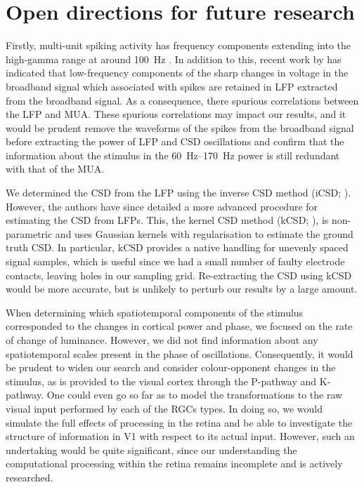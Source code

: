 \section{Open directions for future research}

Firstly, multi-unit spiking activity has frequency components extending into the high-gamma range at around \SI{100}{Hz} \citep{Einevoll2013}.
In addition to this, recent work by \citet{Zanos2011} has indicated that low-frequency components of the sharp changes in voltage in the broadband signal which associated with spikes are retained in \ac{LFP} extracted from the broadband signal.
As a consequence, there spurious correlations between the \ac{LFP} and \ac{MUA}.
These spurious correlations may impact our results, and it would be prudent remove the waveforms of the spikes from the broadband signal before extracting the power of \ac{LFP} and \ac{CSD} oscillations \citep{Zanos2011} and confirm that the information about the stimulus in the \SIrange{60}{170}{Hz} power is still redundant with that of the \ac{MUA}.

We determined the \ac{CSD} from the \ac{LFP} using the inverse \ac{CSD} method (iCSD; \citealp{Pettersen2006}).
However, the authors have since detailed a more advanced procedure for estimating the \ac{CSD} from \acp{LFP}.
This, the kernel \acl{CSD} method (kCSD; \citealp{Potworowski2012}), is non-parametric and uses Gaussian kernels with regularisation to estimate the ground truth \ac{CSD}.
In particular, kCSD provides a native handling for unevenly spaced signal samples, which is useful since we had a small number of faulty electrode contacts, leaving holes in our sampling grid.
Re-extracting the \ac{CSD} using kCSD would be more accurate, but is unlikely to perturb our results by a large amount.

When determining which spatiotemporal components of the stimulus corresponded to the changes in cortical power and phase, we focused on the rate of change of luminance.
However, we did not find information about any spatiotemporal scales present in the phase of oscillations.
Consequently, it would be prudent to widen our search and consider colour-opponent changes in the stimulus, as is provided to the visual cortex through the P-pathway and K-pathway.
One could even go so far as to model the transformations to the raw visual input performed by each of the \acp{RGC} types.
In doing so, we would simulate the full effects of processing in the retina and be able to investigate the structure of information in \ac{V1} with respect to its actual input.
However, such an undertaking would be quite significant, since our understanding the computational processing within the retina remains incomplete and is actively researched.

